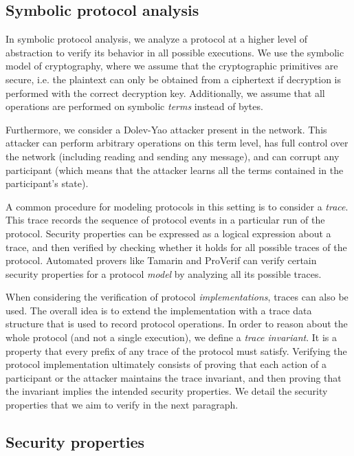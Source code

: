 \subsection{Symbolic protocol analysis}
\label{sec:symbolic-protocol-analysis}

In symbolic protocol analysis, we analyze a protocol at a higher level of abstraction to verify its behavior in all possible executions.
We use the symbolic model of cryptography, where we assume that the cryptographic primitives are secure, i.e. the plaintext can only be obtained from a ciphertext if decryption is performed with the correct decryption key.
Additionally, we assume that all operations are performed on symbolic \emph{terms} instead of bytes.%

Furthermore, we consider a Dolev-Yao\cite{} attacker present in the network. This attacker can perform arbitrary operations on this term level, has full control over the network (including reading and sending any message), and can corrupt any participant (which means that the attacker learns all the terms contained in the participant's state).

A common procedure for modeling protocols in this setting is to consider a \emph{trace}. This trace records the sequence of protocol events in a particular run of the protocol.
Security properties can be expressed as a logical expression about a trace, and then verified by checking whether it holds for all possible traces of the protocol.
Automated provers like Tamarin and ProVerif can verify certain security properties for a protocol \emph{model} by analyzing all its possible traces.

When considering the verification of protocol \emph{implementations}, traces can also be used. The overall idea is to extend the implementation with a trace data structure that is used to record protocol operations. In order to reason about the whole protocol (and not a single execution), we define a \emph{trace invariant}. It is a property that every prefix of any trace of the protocol must satisfy.
Verifying the protocol implementation ultimately consists of proving that each action of a participant or the attacker maintains the trace invariant, and then proving that the invariant implies the intended security properties.
We detail the security properties that we aim to verify in the next paragraph.

\subsection{Security properties}
\label{sec:security-properties-def}

